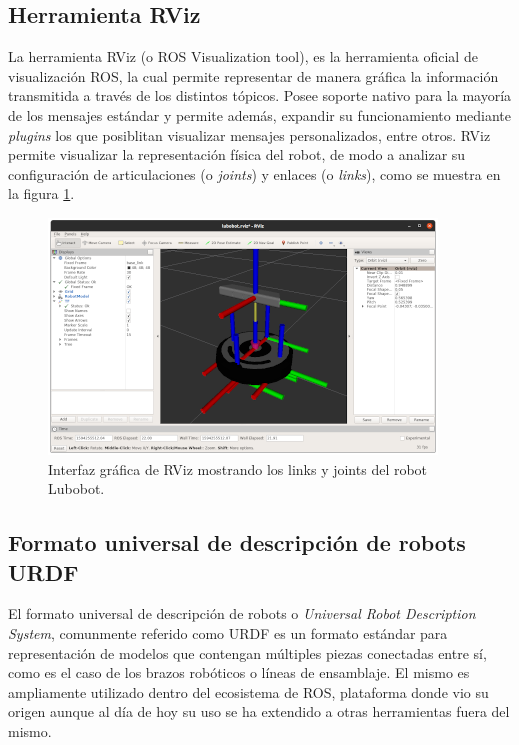 \subsection{Herramienta RViz}

La herramienta RViz (o ROS Visualization tool), es la herramienta oficial de visualización ROS, la cual permite representar de manera gráfica la información transmitida a través de los distintos tópicos. Posee soporte nativo para la mayoría de los mensajes estándar y permite además, expandir su funcionamiento mediante \textit{plugins} los que posiblitan visualizar mensajes personalizados, entre otros.\newline
RViz permite visualizar la representación física del robot, de modo a analizar su configuración de articulaciones (o \textit{joints}) y enlaces (o \textit{links}), como se muestra en la figura \ref{fig:rviz}.

\begin{figure}[ht]
	\centering
	\includegraphics{./Figures/rviz.png}
	\caption{Interfaz gráfica de RViz mostrando los links y joints del robot Lubobot.}
	\label{fig:rviz}
\end{figure}

\subsection{Formato universal de descripción de robots URDF}

El formato universal de descripción de robots o \textit{Universal Robot Description System}, comunmente referido como URDF es un formato estándar para representación de modelos que contengan múltiples piezas conectadas entre sí, como es el caso de los brazos robóticos o líneas de ensamblaje. El mismo es ampliamente utilizado dentro del ecosistema de ROS, plataforma donde vio su origen aunque al día de hoy su uso se ha extendido a otras herramientas fuera del mismo.

